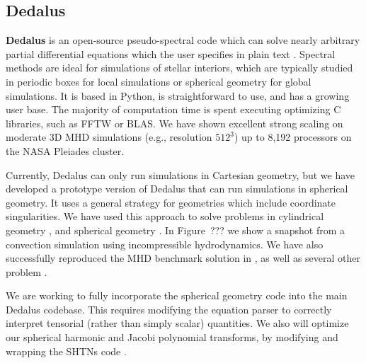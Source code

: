 {\color{purple}    
\subsection{Dedalus}}

\textbf{Dedalus} is an open-source pseudo-spectral code which can solve nearly arbitrary partial differential equations which the user specifies in plain text \citep[][source code at: dedalus-project.org]{Burns2016}. Spectral methods are ideal for simulations of stellar interiors, which are typically studied in periodic boxes for local simulations or spherical geometry for global simulations. It is based in Python, is straightforward to use, and has a growing user base. The majority of computation time is spent executing optimizing C libraries, such as FFTW or BLAS. We have shown excellent strong scaling on moderate 3D MHD simulations (e.g., resolution $512^3$) up to 8,192 processors on the NASA Pleiades cluster.

Currently, Dedalus can only run simulations in Cartesian geometry, but we have developed a prototype version of Dedalus that can run simulations in spherical geometry. It uses a general strategy for geometries which include coordinate singularities. We have used this approach to solve problems in cylindrical geometry \cite{Vasil_2016}, and spherical geometry \citep[][submitted to JCP]{p}. In Figure~??? we show a snapshot from a convection simulation using incompressible hydrodynamics. We have also successfully reproduced the MHD benchmark solution in \cite{Marti_2014}, as well as several other problem \citep[][submitted to JCP]{s}.

We are working to fully incorporate the spherical geometry code into the main Dedalus codebase. This requires modifying the equation parser to correctly interpret tensorial (rather than simply scalar) quantities. We also will optimize our spherical harmonic and Jacobi polynomial transforms, by modifying and wrapping the SHTNs code \cite{Schaeffer_2013}.
